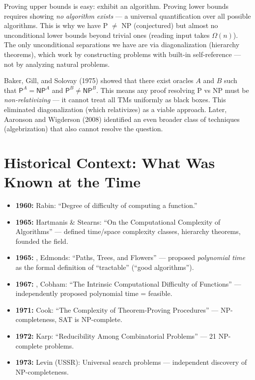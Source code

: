 Proving upper bounds is easy: exhibit an algorithm. Proving lower bounds requires showing \emph{no algorithm exists} — a universal quantification over all possible algorithms. This is why we have P $\neq$ NP (conjectured) but almost no unconditional lower bounds beyond trivial ones (reading input takes $\Omega(n)$). The only unconditional separations we have are via diagonalization (hierarchy theorems), which work by constructing problems with built-in self-reference — not by analyzing natural problems.

Baker, Gill, and Solovay (1975) showed that there exist oracles $A$ and $B$ such that $\mathsf{P}^A = \mathsf{NP}^A$ and $\mathsf{P}^B \neq \mathsf{NP}^B$. This means any proof resolving P vs NP must be \emph{non-relativizing} — it cannot treat all TMs uniformly as black boxes. This eliminated diagonalization (which relativizes) as a viable approach. Later, Aaronson and Wigderson (2008) identified an even broader class of techniques (algebrization) that also cannot resolve the question.

\section{Historical Context: What Was Known at the Time}
\label{sec:complexity:context}

\begin{itemize}
\item \textbf{1960:} Rabin: ``Degree of difficulty of computing a function.''
\item \textbf{1965:} Hartmanis \& Stearns: ``On the Computational Complexity of Algorithms'' — defined time/space complexity classes, hierarchy theorems, founded the field.
\item \textbf{1965:} \cite{edmonds1965}, Edmonds: ``Paths, Trees, and Flowers'' — proposed \emph{polynomial time} as the formal definition of ``tractable'' (``good algorithms'').
\item \textbf{1967:} \cite{cobham1965}, Cobham: ``The Intrinsic Computational Difficulty of Functions'' — independently proposed polynomial time = feasible.
\item \textbf{1971:} Cook: ``The Complexity of Theorem-Proving Procedures'' — NP-completeness, SAT is NP-complete.
\item \textbf{1972:} Karp: ``Reducibility Among Combinatorial Problems'' — 21 NP-complete problems.
\item \textbf{1973:} Levin (USSR): Universal search problems — independent discovery of NP-completeness.
\end{itemize}


